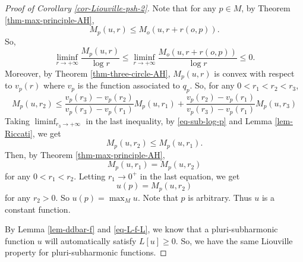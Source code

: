 \documentclass[12pt]{amsart}
\theoremstyle{definition}
\theoremstyle{remark}
\numberwithin{equation}{section}
\begin{document}
\begin{proof}[Proof of Corollary \ref{cor-Liouville-psh-2}] Note that for any $p\in M$, by Theorem \ref{thm-max-principle-AH},
\begin{equation}
M_p(u,r)\leq M_o(u,r+r(o,p)).
\end{equation}
So,
\begin{equation}\label{eq-sub-log-p}
\liminf_{r\to+\infty}\frac{M_p(u,r)}{\log r}\leq \liminf_{r\to+\infty}\frac{M_o(u,r+r(o,p))}{\log r}\leq 0.
\end{equation}
Moreover, by Theorem \ref{thm-three-circle-AH}, $M_p(u,r)$ is convex with respect to $v_p(r)$ where $v_p$ is the function associated to $q_p$. So, for any $0<r_1<r_2<r_3$,
\begin{equation}
M_p(u,r_2)\leq \frac{v_p(r_3)-v_p(r_2)}{v_p(r_3)-v_p(r_1)}M_p(u,r_1)+\frac{v_p(r_2)-v_p(r_1)}{v_p(r_3)-v_p(r_1) }M_p(u,r_3)
\end{equation}
Taking $\liminf_{r_3\to+\infty}$ in the last inequality, by \eqref{eq-sub-log-p} and Lemma \ref{lem-Riccati}, we get
\begin{equation}
M_p(u,r_2)\leq M_p(u,r_1).
\end{equation}
Then, by Theorem  \ref{thm-max-principle-AH},
$$M_p(u,r_1)=M_p(u,r_2)$$
for any $0<r_1<r_2$. Letting $r_1\to 0^+$ in the last equation, we get
\begin{equation}
u(p)=M_p(u,r_2)
\end{equation}
for any $r_2>0$. So $u(p)=\max_M u$. Note that $p$ is arbitrary. Thus $u$ is a constant function.

By Lemma \ref{lem-ddbar-f} and \eqref{eq-L-f-L}, we know that a pluri-subharmonic function $u$ will automatically satisfy $L[u]\geq 0$. So, we have the same Liouville property for pluri-subharmonic functions.
\end{proof}
\end{document}
